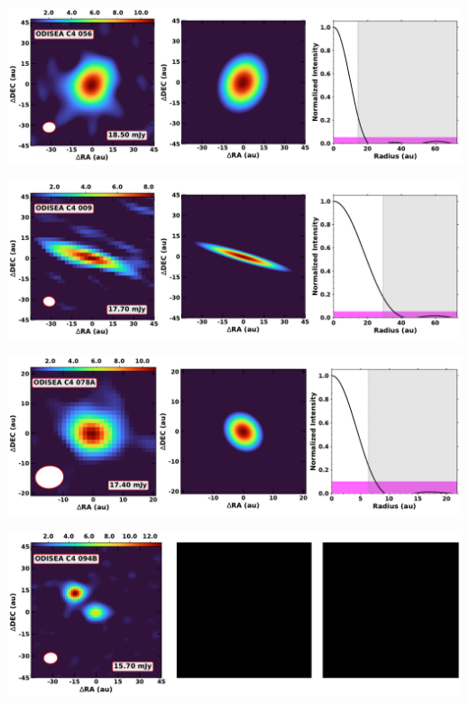 \vspace{0pt}
\begin{minipage}{.49\textwidth}
	 \centering
	 	 \hrulesep
	 	 \includegraphics[width=1\linewidth]{pdf/0+I_F/021_odisea_c4_056_cutout.pdf}
\end{minipage}%
\vrulesep
\begin{minipage}{.49\textwidth}
	 \centering
	 	 \hrulesep
	 	 \includegraphics[width=1\linewidth]{pdf/0+I_F/020_odisea_c4_009_cutout.pdf}
\end{minipage}%
\vspace{0pt}
\begin{minipage}{.49\textwidth}
	 \centering
	 	 \hrulesep
	 	 \includegraphics[width=1\linewidth]{pdf/0+I_F/019_odisea_c4_078a_cutout.pdf}
\end{minipage}%
\vrulesep
\begin{minipage}{.49\textwidth}
	 \centering
	 	 \hrulesep
	 	 \includegraphics[width=1\linewidth]{pdf/0+I_F/015_odisea_c4_094b_cutout.pdf}
\end{minipage}%
